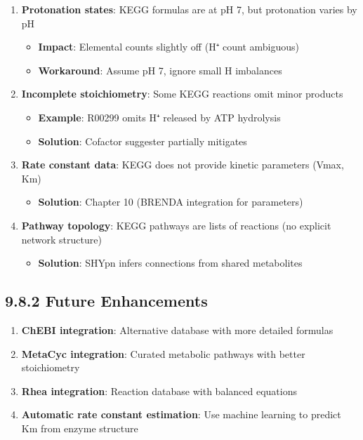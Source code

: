 \begin{enumerate}
\def\labelenumi{\arabic{enumi}.}
\tightlist
\item
  \textbf{Protonation states}: KEGG formulas are at pH 7, but
  protonation varies by pH

  \begin{itemize}
  \tightlist
  \item
    \textbf{Impact}: Elemental counts slightly off (H⁺ count ambiguous)
  \item
    \textbf{Workaround}: Assume pH 7, ignore small H imbalances
  \end{itemize}
\item
  \textbf{Incomplete stoichiometry}: Some KEGG reactions omit minor
  products

  \begin{itemize}
  \tightlist
  \item
    \textbf{Example}: R00299 omits H⁺ released by ATP hydrolysis
  \item
    \textbf{Solution}: Cofactor suggester partially mitigates
  \end{itemize}
\item
  \textbf{Rate constant data}: KEGG does not provide kinetic parameters
  (Vmax, Km)

  \begin{itemize}
  \tightlist
  \item
    \textbf{Solution}: Chapter 10 (BRENDA integration for parameters)
  \end{itemize}
\item
  \textbf{Pathway topology}: KEGG pathways are lists of reactions (no
  explicit network structure)

  \begin{itemize}
  \tightlist
  \item
    \textbf{Solution}: SHYpn infers connections from shared metabolites
  \end{itemize}
\end{enumerate}

\hypertarget{future-enhancements}{%
\subsection{9.8.2 Future Enhancements}\label{future-enhancements}}

\begin{enumerate}
\def\labelenumi{\arabic{enumi}.}
\tightlist
\item
  \textbf{ChEBI integration}: Alternative database with more detailed
  formulas
\item
  \textbf{MetaCyc integration}: Curated metabolic pathways with better
  stoichiometry
\item
  \textbf{Rhea integration}: Reaction database with balanced equations
\item
  \textbf{Automatic rate constant estimation}: Use machine learning to
  predict Km from enzyme structure
\end{enumerate}


